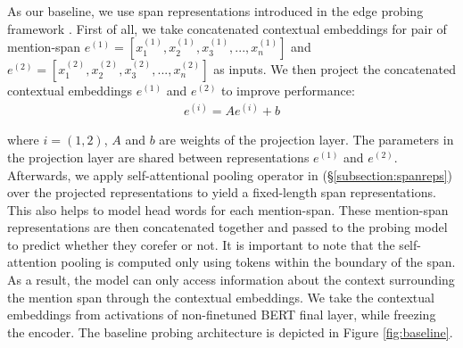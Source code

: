 \documentclass[11pt]{article}
\begin{document}



As our baseline, we use span representations introduced in the edge probing framework \parencite{tenney2019context}. First of all, we take concatenated contextual embeddings for pair of mention-span $e^{(1)} = [x_{1}^{(1)}, x_{2}^{(1)}, x_{3}^{(1)}, ..., x_{n}^{(1)}]$ and $e^{(2)} = [x_{1}^{(2)}, x_{2}^{(2)}, x_{3}^{(2)}, ..., x_{n}^{(2)}]$ as inputs. We then project the concatenated contextual embeddings $e^{(1)}$ and $e^{(2)}$ to improve performance:
\begin{align}
e^{(i)} = Ae^{(i)} + b
\end{align}

where $i = (1,2)$, $A$ and $b$ are weights of the projection layer. The parameters in the projection layer are shared between representations $e^{(1)}$ and $e^{(2)}$. Afterwards, we apply self-attentional pooling operator in (\S \ref{subsection:spanreps}) over the projected representations to yield a fixed-length span representations. This also helps to model head words for each mention-span. These mention-span representations are then concatenated together and passed to the probing model to predict whether they corefer or not. It is important to note that the self-attention pooling is computed only using tokens within the boundary of the span. As a result, the model can only access information about the context surrounding the mention span through the contextual embeddings. We take the contextual embeddings from activations of non-finetuned BERT final layer, while freezing the encoder. The baseline probing architecture is depicted in Figure \ref{fig:baseline}. 
\end{document}
